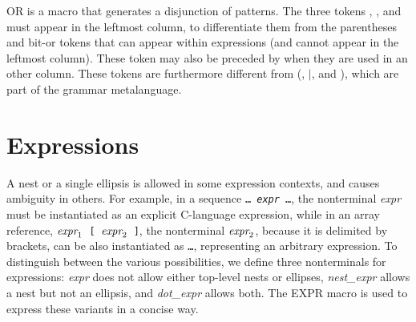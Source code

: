 \documentclass{article}
\newcommand{\mita}[1]{\mbox{\it{{#1}}}}
\newcommand{\mtt}[1]{\mbox{\tt{{#1}}}}
\newcommand{\mth}[1]{\({#1}\)}
\newcommand{\ttmid}{\mbox{\tt \char'174}}
\begin{document}
\noindent
OR is a macro that generates a disjunction of patterns.  The three
tokens \T{(}, \T{\ttmid}, and \T{)} must appear in the leftmost
column, to differentiate them from the parentheses and bit-or tokens
that can appear within expressions (and cannot appear in the leftmost
column). These token may also be preceded by \texttt{\bs}
when they are used in an other column.  These tokens are furthermore
different from (, \(\mid\), and ), which are part of the grammar
metalanguage.

\section{Expressions}

A nest or a single ellipsis is allowed in some expression contexts, and
causes ambiguity in others.  For example, in a sequence \mtt{\ldots
\mita{expr} \ldots}, the nonterminal \mita{expr} must be instantiated as an
explicit C-language expression, while in an array reference,
\mtt{\mth{\mita{expr}_1} \mtt{[} \mth{\mita{expr}_2} \mtt{]}}, the
nonterminal \mth{\mita{expr}_2}, because it is delimited by brackets, can
be also instantiated as \mtt{\ldots}, representing an arbitrary expression.  To
distinguish between the various possibilities, we define three nonterminals
for expressions: {\em expr} does not allow either top-level nests or
ellipses, {\em nest\_expr} allows a nest but not an ellipsis, and {\em
dot\_expr} allows both.  The EXPR macro is used to express these variants
in a concise way.
\end{document}
